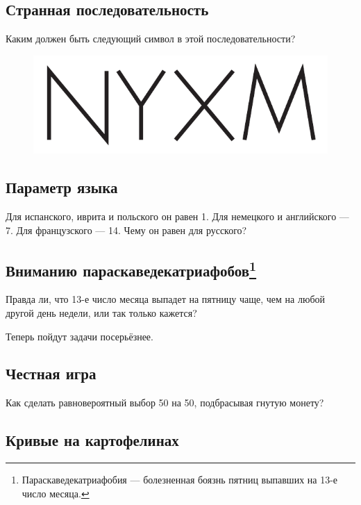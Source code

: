\subsection*{Странная последовательность}

Каким должен быть следующий символ в этой последовательности?

\begin{figure}[h!]
\centering
\includegraphics[scale=0.5]{pics/ZYXW}
\end{figure}

\subsection*{Параметр языка}

Для испанского, иврита и польского он равен 1.
Для немецкого и английского --- 7.
Для французского --- 14.
Чему он равен для русского?

\subsection*{Вниманию параскаведекатриафобов\footnote{Параскаведекатриафобия — болезненная боязнь пятниц выпавших на 13-е число месяца.\pr
}
}



Правда ли, что 13-е число месяца выпадет на пятницу чаще,
чем на любой другой день недели,
или так только кажется?



\medskip

Теперь пойдут задачи посерьёзнее.

\subsection*{Честная игра}

Как сделать равновероятный выбор 50 на 50, подбрасывая гнутую монету?

\subsection*{Кривые на картофелинах}\label{Кривые на картофелинах}


